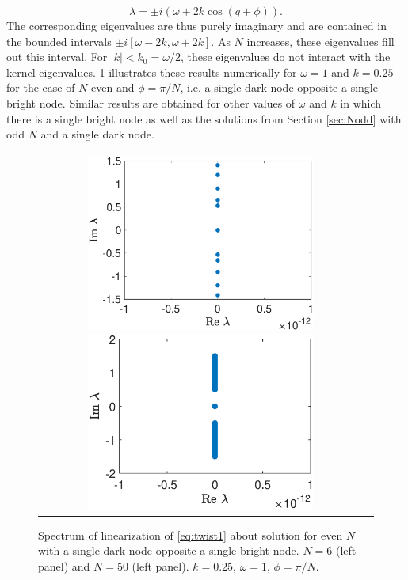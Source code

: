 \documentclass[12pt,reqno]{amsart}
\begin{document}
\begin{equation}\label{eq:dispersion}
\lambda = \pm i \left( \omega + 2 k \cos(q + \phi) \right).
\end{equation}
The corresponding eigenvalues are thus purely imaginary and are contained in the bounded intervals $\pm i[\omega - 2 k, \omega + 2 k]$. As $N$ increases, these eigenvalues fill out this interval. For $|k| < k_0 = \omega/2$, these eigenvalues do not interact with the kernel eigenvalues. \cref{fig:evenholespec} illustrates these results numerically for $\omega = 1$ and $k = 0.25$ for the case of $N$ even and $\phi = \pi/N$, i.e. a single dark node opposite a single bright node. Similar results are obtained for other values of $\omega$ and $k$ in which there is a single bright node as well as the solutions from Section \ref{sec:Nodd} with odd $N$ and a single dark node.
\begin{figure}[H]
\begin{center}
\begin{tabular}{cc}
\includegraphics[width=7.5cm]{images/evenhole6spec.eps}
\includegraphics[width=7.5cm]{images/evenhole50spec.eps}
\end{tabular}
\end{center}
\caption{Spectrum of linearization of \cref{eq:twist1} about solution for even $N$ with a single dark node opposite a single bright node. $N=6$ (left panel) and $N=50$ (left panel). $k=0.25$, $\omega = 1$, $\phi = \pi/N$.}
\label{fig:evenholespec}
\end{figure}
\end{document}
